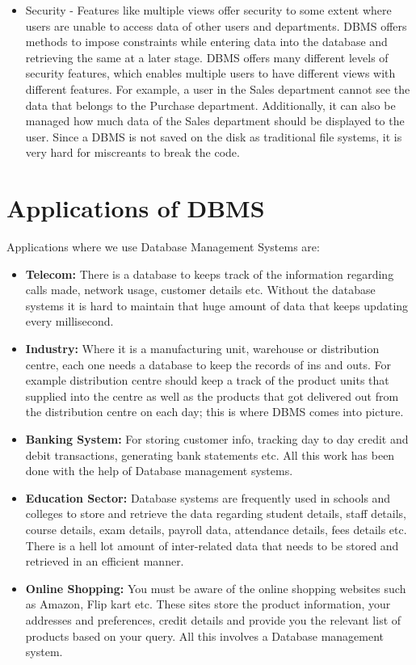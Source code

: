 \begin{itemize}
\item{Security} - Features like multiple views offer security to some extent where users are unable to access data of other users and departments. DBMS offers methods to impose constraints while entering data into the database and retrieving the same at a later stage. DBMS offers many different levels of security features, which enables multiple users to have different views with different features. For example, a user in the Sales department cannot see the data that belongs to the Purchase department.
Additionally, it can also be managed how much data of the Sales department should be displayed to the user. Since a DBMS is not saved on the disk as traditional file systems, it is very hard for miscreants to break the code.
\end{itemize}

\thispagestyle{fancy}

\section{Applications of DBMS}
Applications where we use Database Management Systems are: \\
\begin{itemize}
\item \textbf{Telecom:} There is a database to keeps track of the information regarding calls made, network usage, customer details etc. Without the database systems it is hard to
maintain that huge amount of data that keeps updating every millisecond.
\item \textbf{Industry:} Where it is a manufacturing unit, warehouse or distribution centre, each one needs a database to keep the records of ins and outs. For example distribution
centre should keep a track of the product units that supplied into the centre as well as
the products that got delivered out from the distribution centre on each day; this is
where DBMS comes into picture.
\item \textbf{Banking System: } For storing customer info, tracking day to day credit and debit
transactions, generating bank statements etc. All this work has been done with the help
of Database management systems.
\item \textbf{Education Sector: } Database systems are frequently used in schools and colleges to store and retrieve the data regarding student details, staff details, course details, exam
details, payroll data, attendance details, fees details etc. There is a hell lot amount of
inter-related data that needs to be stored and retrieved in an efficient manner.
\item \textbf{Online Shopping: }You must be aware of the online shopping websites such as
Amazon, Flip kart etc. These sites store the product information, your addresses and
preferences, credit details and provide you the relevant list of products based on your
query. All this involves a Database management system.
\end{itemize}
\thispagestyle{fancy}
\newpage
